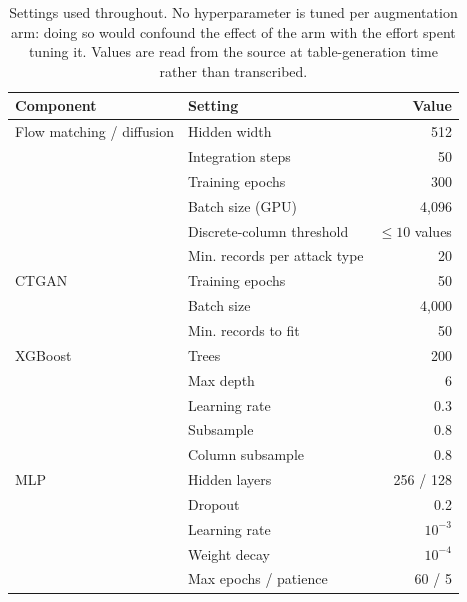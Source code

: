 \begin{table}[t]
\centering
\caption{Settings used throughout. No hyperparameter is tuned per augmentation arm: doing so would confound the effect of the arm with the effort spent tuning it. Values are read from the source at table-generation time rather than transcribed.}
\label{tab:hyper}
\begin{tabular}{llr}
\toprule
Component & Setting & Value \\
\midrule
Flow matching / diffusion & Hidden width & 512 \\
 & Integration steps & 50 \\
 & Training epochs & 300 \\
 & Batch size (GPU) & 4,096 \\
 & Discrete-column threshold & $\leq 10$ values \\
 & Min. records per attack type & 20 \\
\midrule
CTGAN & Training epochs & 50 \\
 & Batch size & 4,000 \\
 & Min. records to fit & 50 \\
\midrule
XGBoost & Trees & 200 \\
 & Max depth & 6 \\
 & Learning rate & 0.3 \\
 & Subsample & 0.8 \\
 & Column subsample & 0.8 \\
\midrule
MLP & Hidden layers & 256 / 128 \\
 & Dropout & 0.2 \\
 & Learning rate & $10^{-3}$ \\
 & Weight decay & $10^{-4}$ \\
 & Max epochs / patience & 60 / 5 \\
\bottomrule
\end{tabular}
\end{table}
